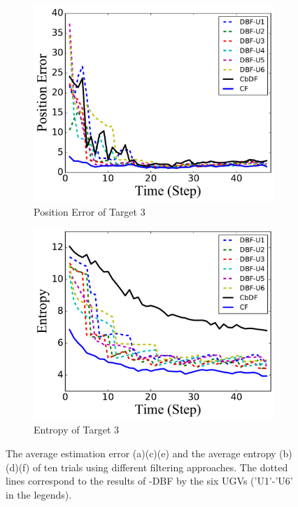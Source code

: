 \begin{figure}
		\begin{subfigure}[b]{0.23\textwidth}
			\includegraphics[width=\textwidth]{figures/hetero_mov_sen_mov_tar_pos_err_noise_sin}
			\caption{Position Error of Target $3$}\label{fig:sin_pos_err}
		\end{subfigure}
		\begin{subfigure}[b]{0.23\textwidth}
			\includegraphics[width=\textwidth]{figures/hetero_mov_sen_mov_tar_entropy_noise_sin}
			\caption{Entropy of Target $3$}\label{fig:sin_ent}
		\end{subfigure}		
		\caption{\textcolor{\revcol}{The average estimation error (a)(c)(e) and the average entropy (b)(d)(f) of ten trials using different filtering approaches. The dotted lines correspond to the results of \proto-DBF by the six UGVs ('U1'-'U6' in the legends).}}
		\label{fig:metrics}
	\end{figure}	

